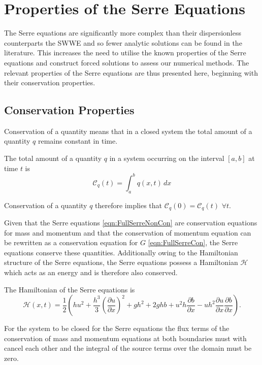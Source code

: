 \section{Properties of the Serre Equations}
The Serre equations are significantly more complex than their dispersionless counterparts the SWWE and so fewer analytic solutions can be found in the literature. This increases the need to utilise the known properties of the Serre equations and construct forced solutions to assess our numerical methods. The relevant properties of the Serre equations are thus presented here, beginning with their conservation properties. 


\subsection{Conservation Properties}
Conservation of a quantity means that in a closed system the total amount of a quantity $q$ remains constant in time.
\begin{defn}
	\label{defn:TotalAmmountab}
	The total amount of a quantity $q$ in a system occurring on the interval $[a,b]$ at time $t$ is
	\begin{equation*}
	\mathcal{C}_q(t) = \int_{a}^{b} q(x,t)\, dx
	\end{equation*}
\end{defn}
Conservation of a quantity $q$ therefore implies that $\mathcal{C}_{q}(0) = \mathcal{C}_{q}(t)$ $\forall t$.

Given that the Serre equations \eqref{eqn:FullSerreNonCon} are conservation equations for mass and momentum and that the conservation of momentum equation can be rewritten as a conservation equation for $G$ \eqref{eqn:FullSerreCon}, the Serre equations conserve these quantities. Additionally owing to the Hamiltonian structure of the Serre equations, the Serre equations possess a Hamiltonian $\mathcal{H}$ which acts as an energy and is therefore also conserved.

\begin{defn}
	\label{eqn:Hamildef}
	The Hamiltonian of the Serre equations is
	\begin{equation*}
		\mathcal{H}(x,t) = \frac{1}{2} \left(hu^2 + \frac{h^3}{3} \left(\frac{\partial u}{\partial x}\right)^2 + gh^2 + 2ghb + u^2h\frac{\partial b}{\partial x} - uh^2 \frac{\partial u}{\partial x} \frac{\partial b}{\partial x}  \right).
	\end{equation*}
\end{defn}
For the system to be closed for the Serre equations the flux terms of the conservation of mass and momentum equations at both boundaries must with cancel each other and the integral of the source terms over the domain must be zero.

